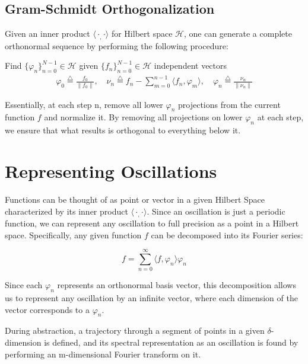 \documentclass{article}
\def\innerproduct{\langle\cdot _, \cdot\rangle}
\begin{document}
\subsection{Gram-Schmidt Orthogonalization}
Given an inner product $\innerproduct$ for Hilbert space $\mathcal{H}$, one can generate a complete orthonormal sequence by performing the following procedure:

Find $\{ \varphi_n \}_{n=0}^{N-1} \in \mathcal{H}$ given $\{ f_n \}_{n=0}^{N-1} \in \mathcal{H}$ independent vectors
\begin{equation}
\begin{gathered}
  \varphi_0 \overset{\bigtriangleup}{=} \frac{f_0}{\| f_0 \|} , \quad
  \nu_n \overset{\bigtriangleup}{=} f_n - \sum_{m=0}^{n-1} \langle f_n , \varphi_m \rangle , \quad
  \varphi_n \overset{\bigtriangleup}{=} \frac{\nu_n}{\| \nu_n \|}
\end{gathered}
\end{equation}

Essentially, at each step n, remove all lower $\varphi_n$ projections from the current function $f$ and normalize it.  By removing all projections on lower $\varphi_n$ at each step, we ensure that what results is orthogonal to everything below it. 

\section{Representing Oscillations}

Functions can be thought of as point or vector in a given Hilbert Space characterized by its inner product $\innerproduct$. Since an oscillation is just a periodic function, we can represent any oscillation to full precision as a point in a Hilbert space.  Specifically, any given function $f$ can be decomposed into its Fourier series:

\begin{equation}
  f = \sum_{n=0}^\infty \langle f, \varphi_n \rangle \varphi_n
\end{equation}

Since each $\varphi_n$ represents an orthonormal basis vector, this decomposition allows us to represent any oscillation by an infinite vector, where each dimension of the vector corresponds to a $\varphi_n$.

During abstraction, a trajectory through a segment of points in a given $\delta$-dimension is defined, and its spectral representation as an oscillation is found by performing an m-dimensional Fourier transform on it.
\end{document}
